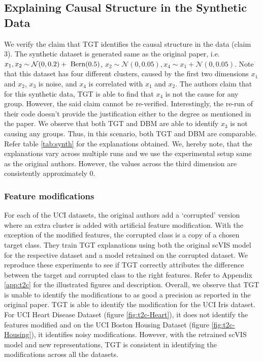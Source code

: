 \subsection{Explaining Causal Structure in the Synthetic Data}
We verify the claim that TGT identifies the causal structure in the data (claim 3). The synthetic dataset is generated same as the original paper, i.e. $x_1, x_2 \sim \mathcal{N}(0,0.2) + \rm\ Bern \rm(0.5)$, $x_2 \sim \mathcal{N}(0,0.05), x_4 \sim x_1 + \mathcal{N}(0, 0.05)$. Note that this dataset has four different clusters, caused by the first two dimensions $x_1$ and $x_2$, $x_3$ is noise, and $x_4$ is correlated with $x_1$ and $x_2$. The authors claim that for this synthetic data, TGT is able to find that $x_4$ is not the cause for any group. However, the said claim cannot be re-verified. Interestingly, the re-run of their code doesn't provide the justification either to the degree as mentioned in the paper. We observe that both TGT and DBM are able to identify $x_3$ is not causing any groups. Thus, in this scenario, both TGT and DBM are comparable. Refer table \ref{tab:synth} for the explanations obtained. We, hereby note, that the explanations vary across multiple runs and we use the experimental setup same as the original authors. However, the values across the third dimension are consistently approximately 0.

\subsubsection{Feature modifications}
For each of the UCI datasets, the original authors add a `corrupted' version where an extra cluster is added with artificial feature modification. With the exception of the modified features, the corrupted class is a copy of a chosen target class. They train TGT explanations using both the original scVIS model for the respective dataset and a model retrained on the corrupted dataset. We reproduce these experiments to see if TGT correctly attributes the difference between the target and corrupted class to the right features. 
Refer to Appendix \ref{app:t2c} for the illustrated figures and description. Overall, we observe that TGT is unable to identify the modifications to as good a precision as reported in the original paper. TGT is able to identify the modification for the UCI Iris dataset. For UCI Heart Disease Dataset (figure \ref{fig:t2c-Heart}), it does not identify the features modified and on the UCI Boston Housing Dataset (figure \ref{fig:t2c-Housing}), it identifies noisy modifications. However, with the retrained scVIS model and new representations, TGT is consistent in identifying the modifications across all the datasets. 

